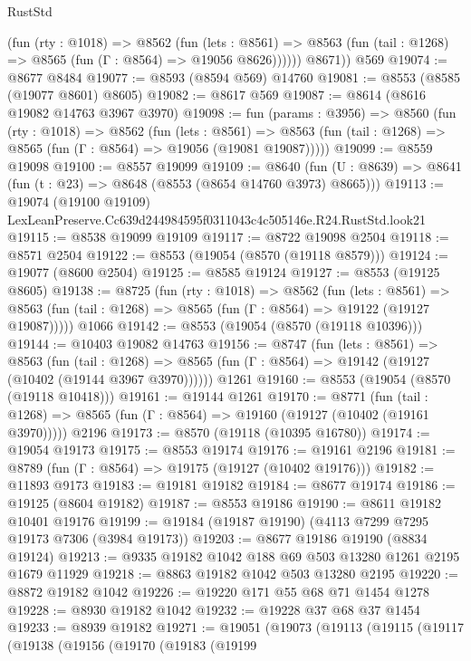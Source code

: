 \begin{lexlean}{RustStd}
\begin{coremodule}
            (fun (rty : @1018) =>
            @8562
              (fun (lets : @8561) =>
              @8563 (fun (tail : @1268) => @8565 (fun (Γ : @8564) => @19056 @8626))))))
        @8671))
    @569
@19074 := @8677 @8484
@19077 := @8593 (@8594 @569) @14760
@19081 := @8553 (@8585 (@19077 @8601) @8605)
@19082 := @8617 @569
@19087 := @8614 (@8616 @19082 @14763 @3967 @3970)
@19098 := fun (params : @3956) =>
  @8560
    (fun (rty : @1018) =>
    @8562
      (fun (lets : @8561) =>
      @8563 (fun (tail : @1268) => @8565 (fun (Γ : @8564) => @19056 (@19081 @19087)))))
@19099 := @8559 @19098
@19100 := @8557 @19099
@19109 := @8640
    (fun (U : @8639) => @8641 (fun (t : @23) => @8648 (@8553 (@8654 @14760 @3973) @8665)))
@19113 := @19074
    (@19100 @19109)
    LexLeanPreserve.Cc639d244984595f0311043c4c505146e.R24.RustStd.look21
@19115 := @8538 @19099 @19109
@19117 := @8722 @19098 @2504
@19118 := @8571 @2504
@19122 := @8553 (@19054 (@8570 (@19118 @8579)))
@19124 := @19077 (@8600 @2504)
@19125 := @8585 @19124
@19127 := @8553 (@19125 @8605)
@19138 := @8725
    (fun (rty : @1018) =>
    @8562
      (fun (lets : @8561) =>
      @8563 (fun (tail : @1268) => @8565 (fun (Γ : @8564) => @19122 (@19127 @19087)))))
    @1066
@19142 := @8553 (@19054 (@8570 (@19118 @10396)))
@19144 := @10403 @19082 @14763
@19156 := @8747
    (fun (lets : @8561) =>
    @8563
      (fun (tail : @1268) =>
      @8565 (fun (Γ : @8564) => @19142 (@19127 (@10402 (@19144 @3967 @3970))))))
    @1261
@19160 := @8553 (@19054 (@8570 (@19118 @10418)))
@19161 := @19144 @1261
@19170 := @8771
    (fun (tail : @1268) => @8565 (fun (Γ : @8564) => @19160 (@19127 (@10402 (@19161 @3970)))))
    @2196
@19173 := @8570 (@19118 (@10395 @16780))
@19174 := @19054 @19173
@19175 := @8553 @19174
@19176 := @19161 @2196
@19181 := @8789 (fun (Γ : @8564) => @19175 (@19127 (@10402 @19176)))
@19182 := @11893 @9173
@19183 := @19181 @19182
@19184 := @8677 @19174
@19186 := @19125 (@8604 @19182)
@19187 := @8553 @19186
@19190 := @8611 @19182 @10401 @19176
@19199 := @19184 (@19187 @19190) (@4113 @7299 @7295 @19173 @7306 (@3984 @19173))
@19203 := @8677 @19186 @19190 (@8834 @19124)
@19213 := @9335 @19182 @1042 @188 @69 @503 @13280 @1261 @2195 @1679 @11929
@19218 := @8863 @19182 @1042 @503 @13280 @2195
@19220 := @8872 @19182 @1042
@19226 := @19220 @171 @55 @68 @71 @1454 @1278
@19228 := @8930 @19182 @1042
@19232 := @19228 @37 @68 @37 @1454
@19233 := @8939 @19182
@19271 := @19051
    (@19073
      (@19113
        (@19115
          (@19117
            (@19138
              (@19156
                (@19170
                  (@19183
                    (@19199

\end{coremodule}
\end{lexlean}
